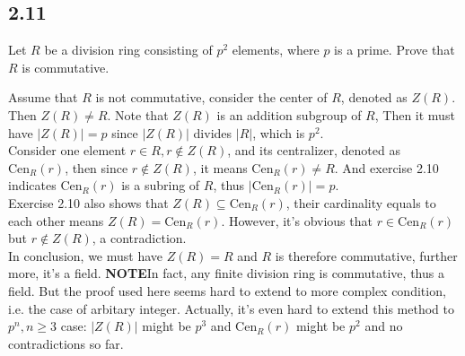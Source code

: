 \documentclass[a4paper, pdf, 12pt]{article}
\makeatletter
\renewenvironment{proof}[1][\proofname]{\par
  \pushQED{\qed}%
  \normalfont \topsep6\p@\@plus6\p@\relax
  \trivlist
  \item[%
    \hskip\labelsep
    \normalfont\bfseries %
    #1%
    \@addpunct{.}%
  ]\ignorespaces
}{%
  \popQED\endtrivlist\@endpefalse
}
\let\qed\relax %
\DeclareRobustCommand{\qed}{%
  \ifmmode \mathqed
  \else
    \leavevmode\unskip\penalty\@M\hbox{}\nobreak\hspace{.5em minus .1em}%
    \hbox{\qedsymbol}%
  \fi
}
\makeatother
\begin{document}
\subsection*{2.11}
Let $R$ be a division ring consisting of $p^{2}$ elements, where $p$ is a prime. 
Prove that $R$ is commutative.
\begin{proof}
  Assume that $R$ is not commutative, consider the center of $R$, denoted as $Z(R)$. Then $Z(R)\neq R$. Note that 
  $Z(R)$ is an addition subgroup of $R$, Then it must have $\lvert Z(R)\rvert = p$ since $\lvert Z(R)\rvert$ divides 
  $\lvert R\rvert$, which is $p^2$.\\

  Consider one element $r\in R, r\notin Z(R)$, and its centralizer, denoted as $\mbox{Cen}_{R}(r)$, then since $r\notin Z(R)$,
  it means $\mbox{Cen}_{R}(r)\neq R$. And exercise 2.10 indicates $\mbox{Cen}_{R}(r)$ is a subring of $R$, thus $\lvert \mbox{Cen}_{R}(r)\rvert=p$.\\

  Exercise 2.10 also shows that $Z(R)\subseteq \mbox{Cen}_{R}(r)$, their cardinality equals to each other means $Z(R)=\mbox{Cen}_{R}(r)$. However, it's obvious
  that $r\in \mbox{Cen}_{R}(r)$ but $r\notin Z(R)$, a contradiction.\\

  In conclusion, we must have $Z(R)=R$ and $R$ is therefore commutative, further more, it's a field.
\end{proof}
\noindent
\textbf{NOTE}\quad In fact, any finite division ring is commutative, thus a field. But the proof used here seems hard to extend to more complex condition, i.e. the case 
of arbitary integer. Actually, it's even hard to extend this method to $p^{n}, n\geq 3$ case: $\lvert Z(R)\rvert$ might be 
$p^{3}$ and $\mbox{Cen}_{R}(r)$ might be $p^{2}$ and no contradictions so far.
\end{document}
